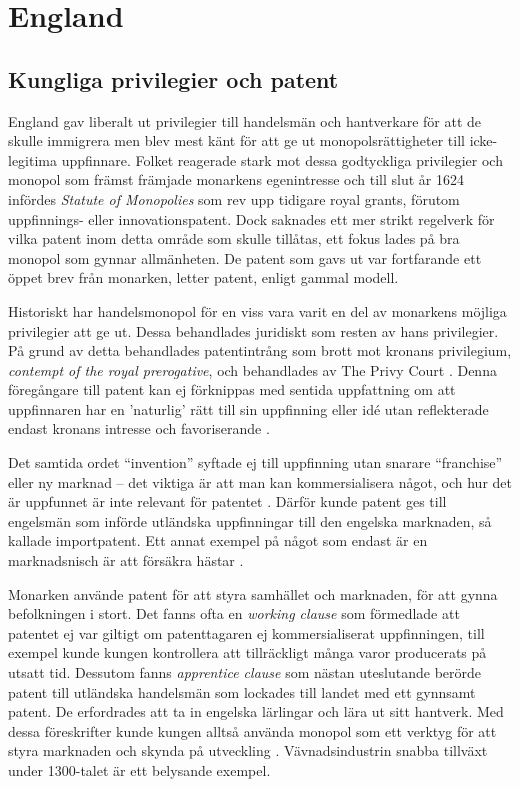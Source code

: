 \section{England} 
\label{sec:eng}

\subsection{Kungliga privilegier och patent} 

England gav liberalt ut privilegier till handelsmän och hantverkare för att de skulle immigrera men blev
mest känt för att ge ut monopolsrättigheter till icke-legitima uppfinnare. Folket reagerade stark mot
dessa godtyckliga privilegier och monopol som främst främjade monarkens egenintresse och till slut år 1624 infördes
\emph{Statute of Monopolies} som rev upp tidigare royal grants, förutom uppfinnings- eller innovationspatent.
Dock saknades ett mer strikt regelverk för vilka patent inom detta område som skulle tillåtas, ett fokus
lades på bra monopol som gynnar allmänheten. De patent som gavs ut var fortfarande ett öppet brev från
monarken, letter patent, enligt gammal modell.

Historiskt har handelsmonopol för en viss vara 
varit en del av monarkens möjliga privilegier att ge ut. Dessa behandlades
juridiskt som resten av hans privilegier. På grund av detta behandlades patentintrång som brott mot kronans privilegium, \emph{contempt of the royal prerogative}, och behandlades av The Privy Court \cite{macleod}. Denna
föregångare till patent kan ej förknippas med sentida uppfattning om att uppfinnaren har en 'naturlig' rätt till sin uppfinning eller idé
utan reflekterade endast kronans intresse och favoriserande \cite{bracha}.

Det samtida ordet ``invention'' syftade ej till uppfinning utan snarare ``franchise'' eller ny marknad -- det
viktiga är att man kan kommersialisera något, och hur det är uppfunnet är inte relevant för patentet \cite{bracha}.
Därför kunde patent ges till engelsmän som införde utländska uppfinningar till den engelska marknaden, så kallade importpatent.
Ett annat exempel på något som endast är en marknadsnisch är att försäkra hästar \cite{davies}.



Monarken använde patent för att styra samhället och marknaden, för att gynna befolkningen i stort. Det fanns ofta en \emph{working clause} som förmedlade att patentet ej var
giltigt om patenttagaren ej kommersialiserat uppfinningen, till exempel kunde kungen kontrollera att
tillräckligt många varor producerats på utsatt tid. Dessutom fanns \emph{apprentice clause} som nästan
uteslutande berörde patent till utländska handelsmän som lockades till landet med ett gynnsamt patent. De erfordrades att ta in engelska lärlingar och
lära ut sitt hantverk. Med dessa föreskrifter kunde kungen alltså använda monopol som ett verktyg för att styra marknaden och skynda på utveckling \cite{bracha}.
Vävnadsindustrin snabba tillväxt under 1300-talet är ett belysande exempel\cite{klitzike}.

